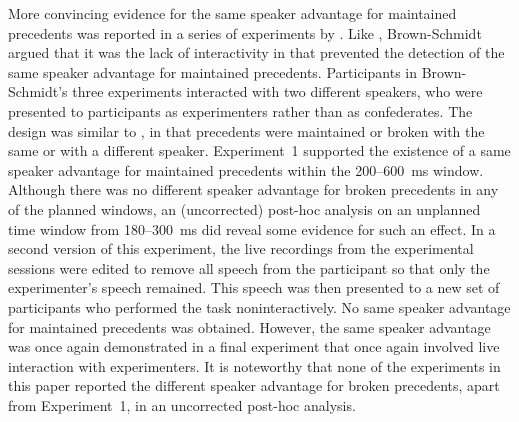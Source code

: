 \documentclass[doc,fignum,apacite,floatsintext]{apa6}
\begin{document}
More convincing evidence for the same speaker advantage for maintained precedents was reported in a series of experiments by .  Like , Brown-Schmidt argued that it was the lack of interactivity in  that prevented the detection of the same speaker advantage for maintained precedents.  Participants in Brown-Schmidt's three experiments interacted with two different speakers, who were presented to participants as experimenters rather than as confederates.  The design was similar to , in that precedents were maintained or broken with the same or with a different speaker.  Experiment~1 supported the existence of a same speaker advantage for maintained precedents within the 200--600~ms window.  Although there was no different speaker advantage for broken precedents in any of the planned windows, an (uncorrected) post-hoc analysis on an unplanned time window from 180--300~ms did reveal some evidence for such an effect.  In a second version of this experiment, the live recordings from the experimental sessions were edited to remove all speech from the participant so that only the experimenter's speech remained.  This speech was then presented to a new set of participants who performed the task noninteractively.  No same speaker advantage for maintained precedents was obtained.  However, the same speaker advantage was once again demonstrated in a final experiment that once again involved live interaction with experimenters.  It is noteworthy that none of the experiments in this paper reported the different speaker advantage for broken precedents, apart from Experiment~1, in an uncorrected post-hoc analysis.
\end{document}
